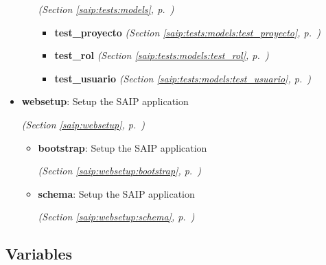 \begin{itemize}
\begin{itemize}
  \textit{(Section \ref{saip:tests:models}, p.~\pageref{saip:tests:models})}

      \begin{itemize}
    \setlength{\parskip}{0ex}
        \item \textbf{test\_proyecto}
  \textit{(Section \ref{saip:tests:models:test_proyecto}, p.~\pageref{saip:tests:models:test_proyecto})}

        \item \textbf{test\_rol}
  \textit{(Section \ref{saip:tests:models:test_rol}, p.~\pageref{saip:tests:models:test_rol})}

        \item \textbf{test\_usuario}
  \textit{(Section \ref{saip:tests:models:test_usuario}, p.~\pageref{saip:tests:models:test_usuario})}

      \end{itemize}
  \end{itemize}
\item \textbf{websetup}: Setup the SAIP application



  \textit{(Section \ref{saip:websetup}, p.~\pageref{saip:websetup})}

  \begin{itemize}
\setlength{\parskip}{0ex}
    \item \textbf{bootstrap}: Setup the SAIP application



  \textit{(Section \ref{saip:websetup:bootstrap}, p.~\pageref{saip:websetup:bootstrap})}

    \item \textbf{schema}: Setup the SAIP application



  \textit{(Section \ref{saip:websetup:schema}, p.~\pageref{saip:websetup:schema})}

  \end{itemize}
\end{itemize}



  \subsection{Variables}

